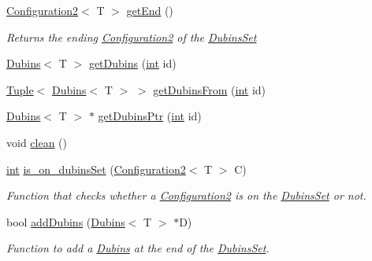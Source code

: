 \begin{DoxyCompactItemize}
\mbox{\hyperlink{class_configuration2}{Configuration2}}$<$ T $>$ \mbox{\hyperlink{class_dubins_set_a3dfb9cf9fc781deaa1f9d2e7201b81e7}{get\+End}} ()
\begin{DoxyCompactList}\small\item\em Returns the ending {\ttfamily \mbox{\hyperlink{class_configuration2}{Configuration2}}} of the {\ttfamily \mbox{\hyperlink{class_dubins_set}{Dubins\+Set}}} \end{DoxyCompactList}\item 
\mbox{\hyperlink{class_dubins}{Dubins}}$<$ T $>$ \mbox{\hyperlink{class_dubins_set_a421897996d88df8eb7dad214d7feb84b}{get\+Dubins}} (\mbox{\hyperlink{draw_8hh_aa620a13339ac3a1177c86edc549fda9b}{int}} id)
\item 
\mbox{\hyperlink{class_tuple}{Tuple}}$<$ \mbox{\hyperlink{class_dubins}{Dubins}}$<$ T $>$ $>$ \mbox{\hyperlink{class_dubins_set_a03b0025e832aa83736f64d8800ba2778}{get\+Dubins\+From}} (\mbox{\hyperlink{draw_8hh_aa620a13339ac3a1177c86edc549fda9b}{int}} id)
\item 
\mbox{\hyperlink{class_dubins}{Dubins}}$<$ T $>$ $\ast$ \mbox{\hyperlink{class_dubins_set_a18797b4a054cd1be2680a26603d2af9a}{get\+Dubins\+Ptr}} (\mbox{\hyperlink{draw_8hh_aa620a13339ac3a1177c86edc549fda9b}{int}} id)
\item 
void \mbox{\hyperlink{class_dubins_set_ac10e53aa7e66448de77371a047801fc6}{clean}} ()
\item 
\mbox{\hyperlink{draw_8hh_aa620a13339ac3a1177c86edc549fda9b}{int}} \mbox{\hyperlink{class_dubins_set_ad651ad84f4de5a395f63152ee663dc02}{is\+\_\+on\+\_\+dubins\+Set}} (\mbox{\hyperlink{class_configuration2}{Configuration2}}$<$ T $>$ C)
\begin{DoxyCompactList}\small\item\em Function that checks whether a {\ttfamily \mbox{\hyperlink{class_configuration2}{Configuration2}}} is on the {\ttfamily \mbox{\hyperlink{class_dubins_set}{Dubins\+Set}}} or not. \end{DoxyCompactList}\item 
bool \mbox{\hyperlink{class_dubins_set_a7a86238ae8e2c86280bbb4e2b47f01a0}{add\+Dubins}} (\mbox{\hyperlink{class_dubins}{Dubins}}$<$ T $>$ $\ast$D)
\begin{DoxyCompactList}\small\item\em Function to add a {\ttfamily \mbox{\hyperlink{class_dubins}{Dubins}}} at the end of the {\ttfamily \mbox{\hyperlink{class_dubins_set}{Dubins\+Set}}}. \end{DoxyCompactList}\item 

\end{DoxyCompactItemize}
